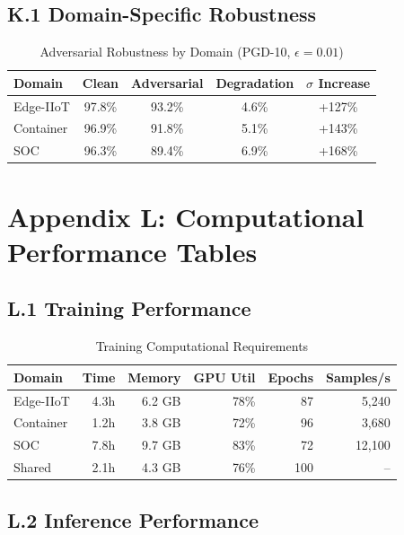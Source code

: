 \documentclass[12pt]{article}
\begin{document}
\subsection{K.1 Domain-Specific Robustness}

\begin{table}[H]
\centering
\caption{Adversarial Robustness by Domain (PGD-10, $\epsilon=0.01$)}
\begin{tabular}{lcccc}
\toprule
\textbf{Domain} & \textbf{Clean} & \textbf{Adversarial} & \textbf{Degradation} & \textbf{$\sigma$ Increase} \\
\midrule
Edge-IIoT & 97.8\% & 93.2\% & 4.6\% & +127\% \\
Container & 96.9\% & 91.8\% & 5.1\% & +143\% \\
SOC & 96.3\% & 89.4\% & 6.9\% & +168\% \\
\bottomrule
\end{tabular}
\end{table}

\section{Appendix L: Computational Performance Tables}

\subsection{L.1 Training Performance}

\begin{table}[H]
\centering
\caption{Training Computational Requirements}
\begin{tabular}{lrrrrr}
\toprule
\textbf{Domain} & \textbf{Time} & \textbf{Memory} & \textbf{GPU Util} & \textbf{Epochs} & \textbf{Samples/s} \\
\midrule
Edge-IIoT & 4.3h & 6.2 GB & 78\% & 87 & 5,240 \\
Container & 1.2h & 3.8 GB & 72\% & 96 & 3,680 \\
SOC & 7.8h & 9.7 GB & 83\% & 72 & 12,100 \\
Shared & 2.1h & 4.3 GB & 76\% & 100 & -- \\
\bottomrule
\end{tabular}
\end{table}

\subsection{L.2 Inference Performance}
\end{document}
